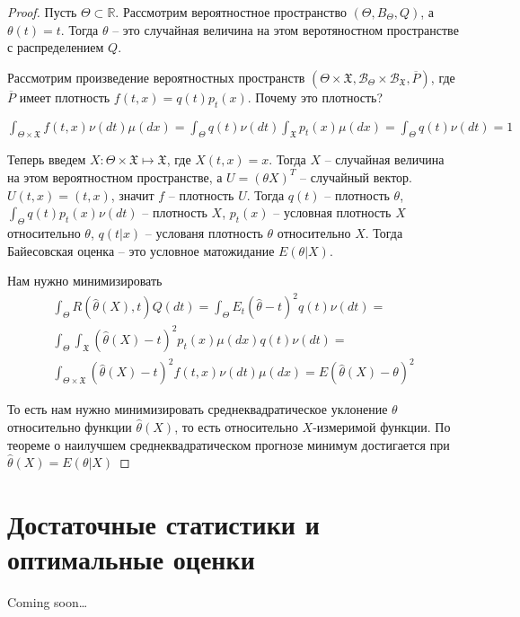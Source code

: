 \documentclass[document.tex]{subfiles}
\begin{document}
\begin{proof}
    Пусть $\Theta \subset \mathbb{R}$. Рассмотрим вероятностное пространство $(\Theta, B_{\Theta}, Q)$, а $\theta(t) =
    t$. Тогда $\theta$ -- это случайная величина на этом веротяностном пространстве с распределением $Q$.

    Рассмотрим произведение вероятностных пространств $(\Theta \times \mathfrak{X}, \mathcal{B}_{\Theta} \times
    \mathcal{B}_{\mathfrak{X}}, \overline P)$, где $\overline P$ имеет плотность $f(t, x) = q(t) p_t(x)$. Почему это
    плотность?

    $\int_{\Theta \times \mathfrak{X}} f(t, x) \nu(dt) \mu(dx) = \int_{\Theta} q(t) \nu(dt) \int_{\mathfrak{X}} p_t(x)
    \mu(dx) = \int_{\Theta} q(t) \nu(dt) = 1$

    Теперь введем $X : \Theta \times \mathfrak{X} \mapsto \mathfrak{X}$, где $X(t, x) = x$. Тогда $X$ -- случайная
    величина на этом вероятностном пространстве, а $U = (\theta X)^T$ -- случайный вектор. $U(t, x) = (t, x)$, значит
    $f$ -- плотность $U$. Тогда $q(t)$ -- плотность $\theta$, $\int_{\Theta} q(t) p_t(x) \nu(dt)$ -- плотность $X$,
    $p_t(x)$ -- условная плотность $X$ относительно $\theta$, $q(t|x)$ -- услованя плотность $\theta$ относительно $X$.
    Тогда Байесовская оценка -- это условное матожидание $E(\theta | X)$.

    Нам нужно минимизировать \begin{multline*}
        \int_{\Theta} R(\hat \theta(X), t)Q(dt) = \int_{\Theta} E_t(\hat \theta - t)^2 q(t) \nu(dt) = \\
        \int_{\Theta} \int_{\mathfrak{X}} (\hat \theta(X) - t)^2 p_t(x) \mu(dx) q(t) \nu(dt) = \\ \int_{\Theta \times
            \mathfrak{X}} (\hat \theta(X) - t)^2 f(t, x) \nu(dt) \mu(dx) = E(\hat \theta(X) - \theta)^2
    \end{multline*}

    То есть нам нужно минимизировать среднеквадратическое уклонение $\theta$ относительно функции $\hat \theta(X)$, то
    есть относительно $X$-измеримой функции. По теореме о наилучшем среднеквадратическом прогнозе минимум достигается
    при $\hat \theta(X) = E(\theta|X)$
\end{proof}

\section{Достаточные статистики и оптимальные оценки}
Coming soon\ldots
\end{document}
